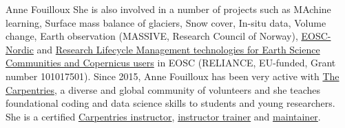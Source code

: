 \begin{participant}[gender=female]{Anne Fouilloux}
She is also involved in a number of projects such as MAchine learning, Surface mass balance of glaciers, Snow cover, In-situ data, Volume change, Earth observation (MASSIVE, Research Council of Norway), \href{https://www.eosc-nordic.eu/}{EOSC-Nordic} and \href{https://www.reliance-project.eu/}{Research Lifecycle Management technologies for Earth Science Communities and Copernicus users} in EOSC (RELIANCE, EU-funded, Grant number 101017501).
   Since 2015, Anne Fouilloux has been very active with \href{https://carpentries.org}{The Carpentries}, a diverse and global community of volunteers and she teaches foundational coding and data science skills to students and young researchers. She is a certified \href{https://carpentries.org/instructors/}{Carpentries instructor}, \href{https://carpentries.org/trainers/}{instructor trainer} and \href{https://carpentries.org/maintainers/}{maintainer}. 
   
\end{participant}

